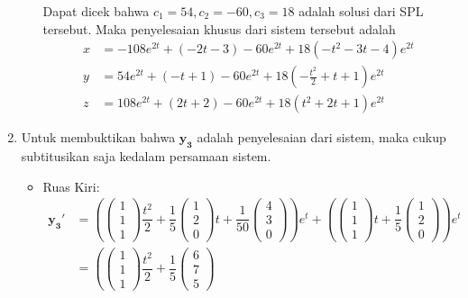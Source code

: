 \documentclass[a4paper]{article}
\theoremstyle{definisi}
\numberwithin{equation}{section}
\begin{document}
\begin{enumerate}
\begin{enumerate}
\begin{equation*}
      \end{equation*}
      Dapat dicek bahwa $c_1=54,c_2=-60,c_3=18$ adalah solusi dari SPL tersebut. Maka penyelesaian khusus dari sistem tersebut adalah
      \begin{align*}
        x&=-108e^{2t}+(-2t-3)-60e^{2t}+18(-t^2-3t-4)e^{2t}\\
        y&=54e^{2t}+(-t+1)-60e^{2t}+18(-\frac{t^2}{2}+t+1)e^{2t}\\
        z&=108e^{2t}+(2t+2)-60e^{2t}+18(t^2+2t+1)e^{2t}
      \end{align*}
    \end{enumerate}
    \item Untuk membuktikan bahwa $\mathbf{y_3}$ adalah penyelesaian dari sistem, maka cukup subtitusikan saja kedalam persamaan sistem.
    \begin{itemize}
      \item Ruas Kiri:
      \begin{align*}
        \mathbf{y_3'}&=\left(\begin{pmatrix}
          1\\1\\1
        \end{pmatrix}\dfrac{t^2}{2}+\dfrac{1}{5}\begin{pmatrix}
          1\\2\\0
        \end{pmatrix}t+\dfrac{1}{50}\begin{pmatrix}
          4\\3\\0
        \end{pmatrix}\right)e^{t}+\left(\begin{pmatrix}
          1\\1\\1
        \end{pmatrix}t+\dfrac{1}{5}\begin{pmatrix}
          1\\2\\0
        \end{pmatrix}\right)e^{t}\\
        &=\left(
          \begin{pmatrix}
            1\\1\\1
          \end{pmatrix}
          \dfrac{t^2}{2}+\dfrac{1}{5}\begin{pmatrix}
            6\\7\\5

\end{pmatrix}
\end{align*}
\end{itemize}
\end{enumerate}
\end{document}
